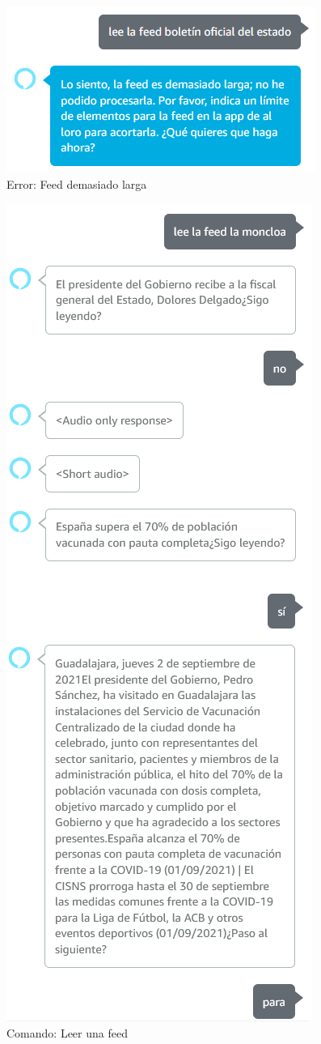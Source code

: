 \documentclass[11pt,spanish,listoffigures,listoftables,table,hyphens,dvipsnames]{tfgetsinf}
\begin{document}
\begin{figure}[!htb]
   \centering
   \includegraphics[width=.9\textwidth]{feed-demasiado-larga.png}
   \caption{Error: Feed demasiado larga}
   \label{figura:error-feed-larga}
\end{figure}

\begin{figure}[ht]
   \centering
   \includegraphics[width=.602\textwidth]{leer-feed.png}
   \caption{Comando: Leer una feed}
   \label{figura:comando-leer-feed}
\end{figure}
\end{document}
